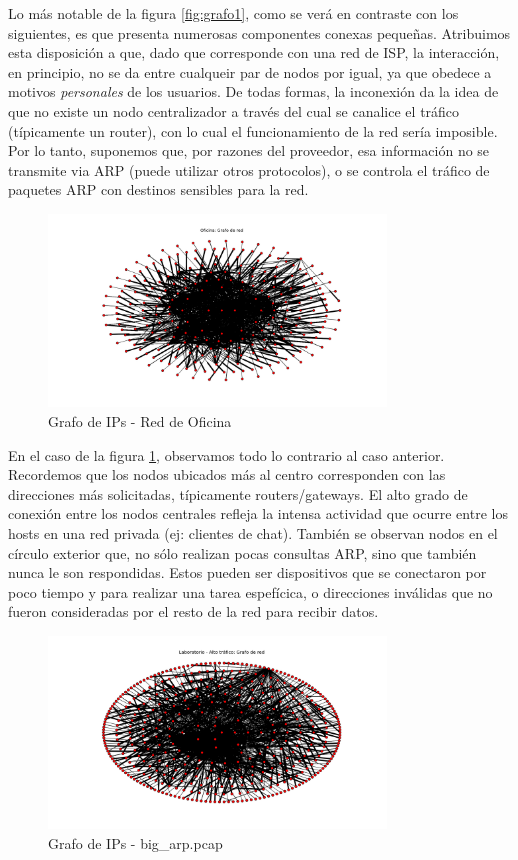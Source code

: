 Lo más notable de la figura \ref{fig:grafo1}, como se verá en contraste con los siguientes, es que presenta numerosas componentes conexas pequeñas. Atribuimos esta disposición a que, dado que corresponde con una red de ISP, la interacción, en principio, no se da entre cualqueir par de nodos por igual, ya que obedece a motivos \emph{personales} de los usuarios. De todas formas, la inconexión da la idea de que no existe un nodo centralizador a través del cual se canalice el tráfico (típicamente un router), con lo cual el funcionamiento de la red sería imposible. Por lo tanto, suponemos que, por razones del proveedor, esa información no se transmite via ARP (puede utilizar otros protocolos), o se controla el tráfico de paquetes ARP con destinos sensibles para la red.

\begin{figure}[h!]
  \centering
    \includegraphics[width=0.8\textwidth]{graficos/grafoOficina.png}
    \caption{Grafo de IPs - Red de Oficina}
    \label{fig:grafo2}
\end{figure}

En el caso de la figura \ref{fig:grafo2}, observamos todo lo contrario al caso anterior. Recordemos que los nodos ubicados más al centro corresponden con las direcciones más solicitadas, típicamente routers/gateways. El alto grado de conexión entre  los nodos centrales refleja la intensa actividad que ocurre entre los hosts en una red privada (ej: clientes de chat). También se observan nodos en el círculo exterior que, no sólo realizan pocas consultas ARP, sino que también nunca le son respondidas. Estos pueden ser dispositivos que se conectaron por poco tiempo y para realizar una tarea espefícica, o direcciones inválidas que no fueron consideradas por el resto de la red para recibir datos.

\begin{figure}[h!]
  \centering
    \includegraphics[width=0.8\textwidth]{graficos/grafoLaboBig.png}
    \caption{Grafo de IPs - big\_arp.pcap}
    \label{fig:grafo3}
\end{figure}

